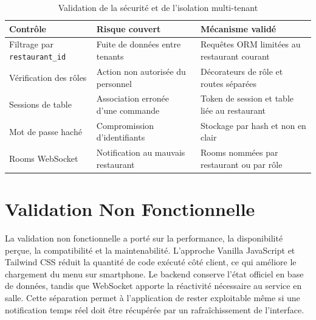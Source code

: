 \documentclass[12pt,a4paper]{report}
\begin{document}
\begin{table}[H]
    \centering
    \begin{tabularx}{\textwidth}{l X X}
        \toprule
        \rowcolor{accent!10}
        \textbf{Contrôle} & \textbf{Risque couvert} & \textbf{Mécanisme validé} \\
        \midrule
        Filtrage par \texttt{restaurant\_id} & Fuite de données entre tenants & Requêtes ORM limitées au restaurant courant \\
        Vérification des rôles & Action non autorisée du personnel & Décorateurs de rôle et routes séparées \\
        Sessions de table & Association erronée d'une commande & Token de session et table liée au restaurant \\
        Mot de passe haché & Compromission d'identifiants & Stockage par hash et non en clair \\
        Rooms WebSocket & Notification au mauvais restaurant & Rooms nommées par restaurant ou par rôle \\
        \bottomrule
    \end{tabularx}
    \caption{Validation de la sécurité et de l'isolation multi-tenant}
    \label{tab:security-tests}
\end{table}

\section{Validation Non Fonctionnelle}

La validation non fonctionnelle a porté sur la performance, la disponibilité perçue, la compatibilité et la maintenabilité. L'approche Vanilla JavaScript et Tailwind CSS réduit la quantité de code exécuté côté client, ce qui améliore le chargement du menu sur smartphone. Le backend conserve l'état officiel en base de données, tandis que WebSocket apporte la réactivité nécessaire au service en salle. Cette séparation permet à l'application de rester exploitable même si une notification temps réel doit être récupérée par un rafraîchissement de l'interface.
\end{document}
